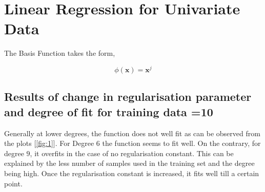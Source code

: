 \section{Linear Regression for Univariate Data}

The Basis Function takes the form,

\begin{equation*}
    \phi{(\mathbf{x})} = {\mathbf{x}^j} \tag{ $0 \leq j \leq Degree$}
\end{equation*}

\subsection{Results of change in regularisation parameter and degree of fit for training data =10}


Generally at lower degrees, the function does not well fit as can be observed from the plots [\ref{fig:1}]. For Degree 6 the function seems to fit well. On the contrary, for degree $9$, it overfits in the case of no regularisation constant. This can be explained by the less number of samples used in the training set and the degree being high. Once the regularisation constant is increased, it fits well till a certain point.

